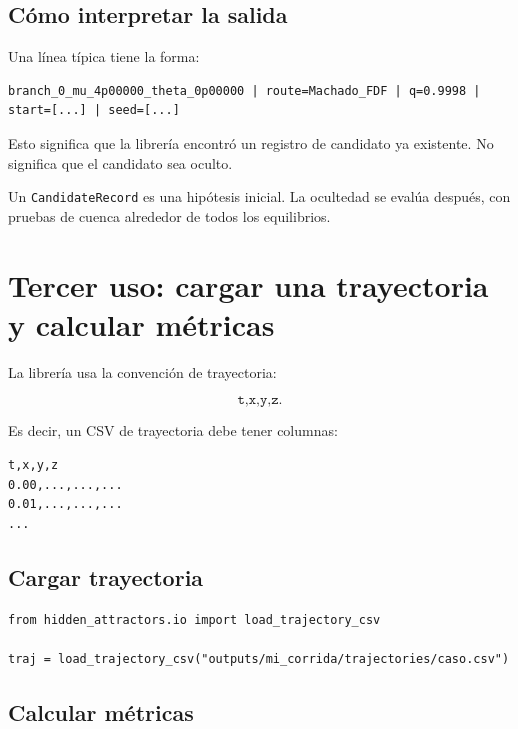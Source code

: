 \documentclass[11pt,letterpaper]{article}
\begin{document}
\subsection{Cómo interpretar la salida}

Una línea típica tiene la forma:

\begin{lstlisting}[style=terminal]
branch_0_mu_4p00000_theta_0p00000 | route=Machado_FDF | q=0.9998 | start=[...] | seed=[...]
\end{lstlisting}

Esto significa que la librería encontró un registro de candidato ya existente. No significa que el candidato sea oculto.

\begin{advertencia}
Un \texttt{CandidateRecord} es una hipótesis inicial. La ocultedad se evalúa después, con pruebas de cuenca alrededor de todos los equilibrios.
\end{advertencia}

\section{Tercer uso: cargar una trayectoria y calcular métricas}

La librería usa la convención de trayectoria:

\begin{equation}
\texttt{t,x,y,z}.
\end{equation}

Es decir, un CSV de trayectoria debe tener columnas:

\begin{lstlisting}[style=terminal]
t,x,y,z
0.00,...,...,...
0.01,...,...,...
...
\end{lstlisting}

\subsection{Cargar trayectoria}

\begin{lstlisting}[style=python]
from hidden_attractors.io import load_trajectory_csv

traj = load_trajectory_csv("outputs/mi_corrida/trajectories/caso.csv")
\end{lstlisting}

\subsection{Calcular métricas}
\end{document}
